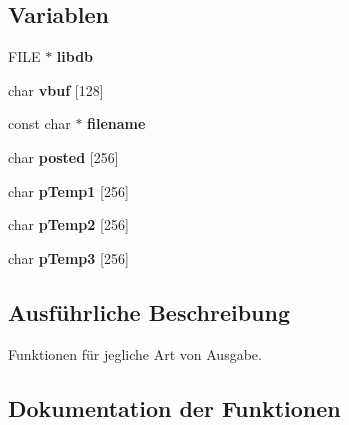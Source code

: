 \subsection*{Variablen}
\begin{DoxyCompactItemize}
\item 
F\+I\+LE $\ast$ {\bfseries libdb}\hypertarget{group___lend_lib_in_ga7eaa119ac9f04253a1f58bb6b09f9df2}{}\label{group___lend_lib_in_ga7eaa119ac9f04253a1f58bb6b09f9df2}

\item 
char {\bfseries vbuf} \mbox{[}128\mbox{]}\hypertarget{group___lend_lib_in_gaa4601e4145c1ddaec0cd8737710b6b42}{}\label{group___lend_lib_in_gaa4601e4145c1ddaec0cd8737710b6b42}

\item 
const char $\ast$ {\bfseries filename}\hypertarget{group___lend_lib_in_ga7efa5e9c7494c7d4586359300221aa5d}{}\label{group___lend_lib_in_ga7efa5e9c7494c7d4586359300221aa5d}

\item 
char {\bfseries posted} \mbox{[}256\mbox{]}\hypertarget{group___lend_lib_in_gae232d1b0328c97f6e77fb1a94660cb44}{}\label{group___lend_lib_in_gae232d1b0328c97f6e77fb1a94660cb44}

\item 
char {\bfseries p\+Temp1} \mbox{[}256\mbox{]}\hypertarget{group___lend_lib_in_gae025d31afa273093de589a20f4f2df35}{}\label{group___lend_lib_in_gae025d31afa273093de589a20f4f2df35}

\item 
char {\bfseries p\+Temp2} \mbox{[}256\mbox{]}\hypertarget{group___lend_lib_in_ga8144306ebceace04737ff8da7aca7f26}{}\label{group___lend_lib_in_ga8144306ebceace04737ff8da7aca7f26}

\item 
char {\bfseries p\+Temp3} \mbox{[}256\mbox{]}\hypertarget{group___lend_lib_in_ga82b1ac173d307099c82705e2ac9b968c}{}\label{group___lend_lib_in_ga82b1ac173d307099c82705e2ac9b968c}

\end{DoxyCompactItemize}


\subsection{Ausführliche Beschreibung}
Funktionen für jegliche Art von Ausgabe. 



\subsection{Dokumentation der Funktionen}
